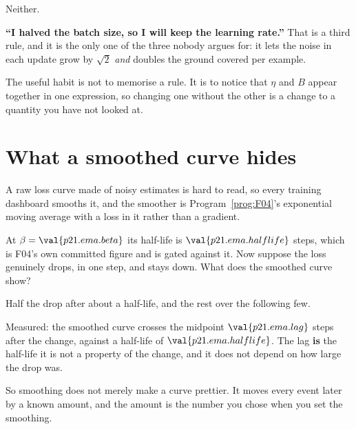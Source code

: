 \begin{fr}
\begin{ansblock}
Neither.
\end{ansblock}

\begin{trapbox}
\textbf{\enquote{I halved the batch size, so I will keep the learning rate.}}
That is a third rule, and it is the only one of the three nobody argues for:
it lets the noise in each update grow by $\sqrt{2}$ \emph{and} doubles the
ground covered per example.

The useful habit is not to memorise a rule. It is to notice that $\eta$ and
$B$ appear together in one expression, so changing one without the other is a
change to a quantity you have not looked at.
\end{trapbox}
\end{fr}

\section{What a smoothed curve hides}
\label{sec:P21-smoothing}

\begin{fr}
A raw loss curve made of noisy estimates is hard to read, so every training
dashboard smooths it, and the smoother is Program~\ref{prog:F04}'s exponential
moving average with a loss in it rather than a gradient.

At $\beta = \val{p21.ema.beta}$ its half-life is $\val{p21.ema.halflife}$
steps, which is F04's own committed figure and is gated against it. Now
suppose the loss genuinely drops, in one step, and stays down. What does the
smoothed curve show?
\dotline
\nextframe
\end{fr}

\begin{fr}
\begin{ansblock}
Half the drop after about a half-life, and the rest over the following few.
\end{ansblock}

Measured: the smoothed curve crosses the midpoint $\val{p21.ema.lag}$ steps
after the change, against a half-life of $\val{p21.ema.halflife}$. The lag
\textbf{is} the half-life \dash{} it is not a property of the change, and it
does not depend on how large the drop was.

So smoothing does not merely make a curve prettier. It moves every event later
by a known amount, and the amount is the number you chose when you set the
smoothing.
\end{fr}

